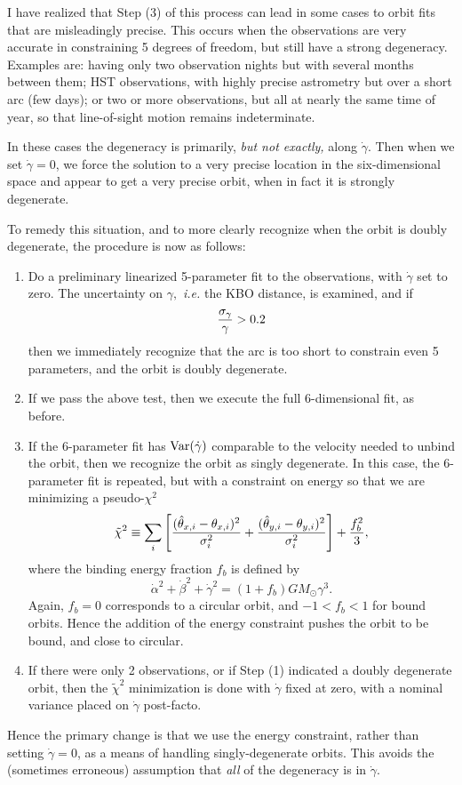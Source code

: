 I have realized that Step (3) of this process can lead in some cases
to orbit fits that are misleadingly precise.  This occurs when the
observations are very accurate in constraining 5 degrees of freedom,
but still have a strong degeneracy.  Examples are:  having only two
observation nights but with several months between them; HST
observations, with highly precise astrometry but over a short arc (few
days); or two or more observations, but all at nearly the same time of
year, so that line-of-sight motion remains indeterminate.

In these cases the degeneracy is primarily, {\em but not exactly,} along
$\dot\gamma$.  Then when we set $\dot\gamma=0$, we force the solution
to a very precise location in the six-dimensional space and appear to
get a very precise orbit, when in fact it is strongly degenerate.

To remedy this situation, and to more clearly recognize when the orbit
is doubly degenerate, the procedure is now as follows:
\begin{enumerate}
\item  Do a preliminary linearized 5-parameter fit to the observations,
with $\dot\gamma$ set to zero.  The uncertainty on $\gamma,$ {\it
i.e.} the KBO distance, is examined, and if
\begin{equation}
{\sigma_\gamma \over \gamma} > 0.2
\end{equation}
then we immediately recognize that the arc is too short to constrain
even 5 parameters, and the orbit is doubly degenerate.
\item If we pass the above test, then we execute the full
6-dimensional fit, as before.
\item If the 6-parameter fit has ${\rm Var}(\dot\gamma)$ comparable to
the velocity needed to unbind the orbit, then we recognize the orbit
as singly degenerate.  In this case, the 6-parameter fit is repeated,
but with a constraint on energy so that we are minimizing a
pseudo-$\chi^2$ 
\begin{equation}
\tilde\chi^2 \equiv \sum_i \left[ { (\hat\theta_{x,i} - \theta_{x,i})^2 \over
\sigma_i^2 } + { (\hat\theta_{y,i} - \theta_{y,i})^2 \over
\sigma_i^2 } \right] + { f_b^2  \over 3},
\end{equation}
where the binding energy fraction $f_b$ is defined by
\begin{equation}
\dot\alpha^2 + \dot\beta^2 + \dot\gamma^2 =
(1+f_b) GM_\odot \gamma^3.
\end{equation}
Again, $f_b=0$ corresponds to a circular orbit, and $-1<f_b<1$ for
bound orbits.  Hence the addition of the energy constraint pushes the
orbit to be bound, and close to circular.
\item If there were only 2 observations, or if Step (1) indicated a
doubly degenerate orbit, then the $\tilde\chi^2$ minimization is done
with $\dot\gamma$ fixed at zero, with a nominal variance placed on
$\dot\gamma$ post-facto.
\end{enumerate}
Hence the primary change is that we use the energy constraint, rather
than setting $\dot\gamma=0$, as a means of handling singly-degenerate
orbits.  This avoids the (sometimes erroneous) assumption that {\em
all} of the degeneracy is in $\dot\gamma$.  

